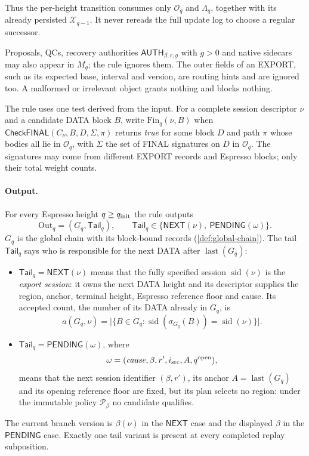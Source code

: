 \documentclass[11pt,a4paper]{article}
\newcommand{\tagg}[1]{\ensuremath{\mathsf{#1}}}
\newcommand{\defterm}[1]{\textcolor{rrBlue}{\textit{#1}}}
\begin{document}
Thus the per-height transition consumes only $\mathcal O_q$ and
$\Lambda_q$, together with its already persisted $\mathcal X_{q-1}$.
It never rereads the full update log to choose a regular successor.

Proposals, QCs, recovery authorities
$\tagg{AUTH}_{\beta,r,g}$ with $g>0$ and native sidecars may also appear in
$M_q$; the rule ignores them. The outer fields of an EXPORT, such as its
expected base, interval and version, are routing hints and are ignored
too. A malformed or irrelevant object grants nothing and blocks nothing.

The rule uses one test derived from the input. For a complete session
descriptor $\nu$ and a candidate DATA block $B$, write
$\mathrm{Fin}_q(\nu,B)$ when
$\tagg{CheckFINAL}(C_\nu,B,D,\Sigma,\pi)$ returns \emph{true} for
some block $D$ and path $\pi$ whose bodies all lie in $\mathcal O_q$, with
$\Sigma$ the set of FINAL signatures on $D$ in $\mathcal O_q$. The
signatures may come from different EXPORT records and Espresso blocks;
only their total weight counts.

\paragraph{Output.}
For every Espresso height $q\ge q_{\rm init}$ the rule outputs
\[
 \boxed{\mathrm{Out}_q=(G_q,\mathsf{Tail}_q)},\qquad
 \mathsf{Tail}_q\in\{\tagg{NEXT}(\nu),\ \tagg{PENDING}(\omega)\}.
\]
$G_q$ is the global chain with its block-bound records
(\cref{def:global-chain}).  The tail $\mathsf{Tail}_q$ says who is responsible for
the next DATA after $\operatorname{last}(G_q)$:
\begin{itemize}[itemsep=2pt]
\item $\mathsf{Tail}_q=\tagg{NEXT}(\nu)$ means that the fully specified session
$\operatorname{sid}(\nu)$ is the \defterm{export session}: it owns the
next DATA height and its descriptor supplies the region, anchor,
terminal height, Espresso reference floor and cause. Its accepted
count, the number of its DATA already in $G_q$, is
\[
 a(G_q,\nu)=
 \bigl|\{B\in G_q:\operatorname{sid}(\sigma_{G_q}(B))
                 =\operatorname{sid}(\nu)\}\bigr|.
 \]
\item $\mathsf{Tail}_q=\tagg{PENDING}(\omega)$, where
\[
 \omega=(\mathit{cause},\beta,r',i_{\rm src},A,q^{\rm open}),
\]
means that the next session identifier $(\beta,r')$, its anchor
$A=\operatorname{last}(G_q)$ and its opening reference floor are fixed,
but its plan selects no region: under the immutable policy
$\mathcal P_\beta$ no candidate qualifies.
\end{itemize}
The current branch version is $\beta(\nu)$ in the \tagg{NEXT} case and
the displayed $\beta$ in the \tagg{PENDING} case.  Exactly one tail
variant is present at every completed replay subposition.
\end{document}
